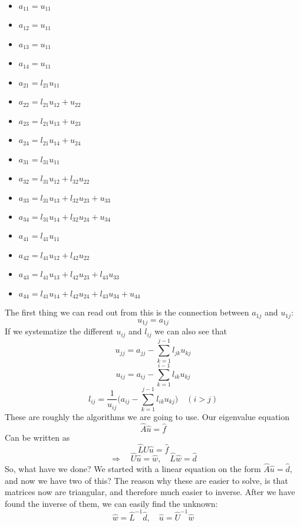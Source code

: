 \documentclass{scrartcl}
\begin{document}
\begin{itemize}
\item $a_{11}=u_{11}$
\item $a_{12}=u_{11}$
\item $a_{13}=u_{11}$
\item $a_{14}=u_{11}$
\item $a_{21}=l_{21}u_{11}$
\item $a_{22}=l_{21}u_{12}+u_{22}$
\item $a_{23}=l_{21}u_{13}+u_{23}$
\item $a_{24}=l_{21}u_{14}+u_{24}$
\item $a_{31}=l_{31}u_{11}$
\item $a_{32}=l_{31}u_{12}+l_{32}u_{22}$
\item $a_{33}=l_{31}u_{13}+l_{32}u_{23}+u_{33}$
\item $a_{34}=l_{31}u_{14}+l_{32}u_{24}+u_{34}$
\item $a_{41}=l_{41}u_{11}$
\item $a_{42}=l_{41}u_{12}+l_{42}u_{22}$
\item $a_{43}=l_{41}u_{13}+l_{42}u_{23}+l_{43}u_{33}$
\item $a_{44}=l_{41}u_{14}+l_{42}u_{24}+l_{43}u_{34}+u_{44}$
\end{itemize}
The first thing we can read out from this is the connection between $a_{1j}$ and $u_{1j}$:
\begin{equation}
u_{1j}=a_{1j}
\end{equation}
If we systematize the different $u_{ij}$ and $l_{ij}$ we can also see that
\begin{equation}
u_{jj}=a_{jj}-\sum_{k=1}^{j-1}l_{jk}u_{kj}
\end{equation}
\begin{equation}
u_{ij}=a_{ij}-\sum_{k=1}^{i-1}l_{ik}u_{kj}
\end{equation}
\begin{equation}
l_{ij}=\frac{1}{u_{ij}}\bigg(a_{ij}-\sum_{k=1}^{j-1}l_{ik}u_{kj}\bigg)\quad(i>j)
\end{equation}
These are roughly the algorithms we are going to use.
Our eigenvalue equation
$$\hat{A}\hat{u}=\hat{f}$$
Can be written as
$$\hat{L}\hat{U}\hat{u}=\hat{f}$$
$$\Rightarrow\quad\hat{U}\hat{u}=\hat{w},\quad\hat{L}\hat{w}=\hat{d}$$
So, what have we done? We started with a linear equation on the form $\hat{A}\hat{u}=\hat{d}$, and now we have two of this? The reason why these are easier to solve, is that matrices now are triangular, and therefore much easier to inverse. After we have found the inverse of them, we can easily find the unknown:
$$\hat{w}=\hat{L}^{-1}\hat{d},\quad\hat{u}=\hat{U}^{-1}\hat{w}$$
\end{document}
